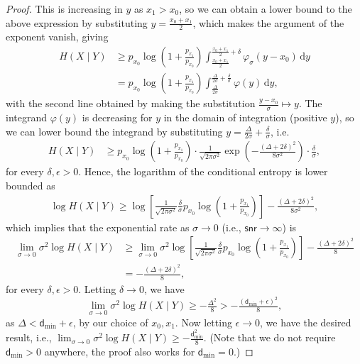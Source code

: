 \documentclass[10pt,a4paper]{amsart}
\newcommand{\dmin}{\mathsf{d}_{\min}}
\newcommand{\snr}{\mathsf{snr}}
\renewcommand{\d}{\,\mathrm{d}}
\begin{document}
\begin{proof}[Proof]
		This is increasing in $y$ as $x_1 > x_0$, so we can obtain a lower bound to the above expression by substituting $y = \frac{x_0 + x_1}{2}$, which makes the argument of the exponent vanish, giving 
		\begin{align*}
			H(X \mid Y) &\geq p_{x_0}\log \left(1+\tfrac{p_{x_1}}{p_{x_0}} \right) \int_{\frac{x_0 + x_1}{2}}^{\frac{x_0 + x_1}{2}+\delta}  \varphi_{\sigma}(y-x_0) \d y \\
			&= p_{x_0}\log \left(1+\tfrac{p_{x_1}}{p_{x_0}} \right) \int_{\frac{\Delta}{2\sigma}}^{\frac{\Delta}{2\sigma} + \frac{\delta}{\sigma}}  \varphi(y) \d y,
		\end{align*}
		with the second line obtained by making the substitution $\frac{y-x_0}{\sigma} \mapsto y$. 
		The integrand $\varphi(y)$ is decreasing for $y$ in the domain of integration (positive $y$), so we can lower bound the integrand by substituting $y = \frac{\Delta}{2\sigma} + \frac{\delta}{\sigma}$, i.e.
		\begin{align*}
			H(X \mid Y) &\geq p_{x_0}\log \left(1+\tfrac{p_{x_1}}{p_{x_0}} \right) \cdot \tfrac{1}{\sqrt{2\pi \sigma^2}} \exp\left(- \tfrac{(\Delta + 2\delta)^2}{8\sigma^2}\right) \cdot \tfrac{\delta}{\sigma},
		\end{align*}
		for every $\delta, \epsilon > 0$. Hence, the logarithm of the conditional entropy is lower bounded as
		\begin{align*}
			\log H(X \mid Y) \geq \log \left[\tfrac{1}{\sqrt{2\pi \sigma^2}}\tfrac{\delta}{\sigma} p_{x_0}\log \left(1+\tfrac{p_{x_1}}{p_{x_0}} \right) \right] - \tfrac{(\Delta + 2\delta)^2}{8\sigma^2},
		\end{align*}
		which implies that the exponential rate as $\sigma \to 0$ (i.e., $\snr \to \infty$) is 
		\begin{align*}
			\lim_{\sigma \to 0} \sigma^2 \log H(X \mid Y) &\geq \lim_{\sigma \to 0} \sigma^2\log \left[\tfrac{1}{\sqrt{2\pi \sigma^2}}\tfrac{\delta}{\sigma} p_{x_0}\log \left(1+\tfrac{p_{x_1}}{p_{x_0}} \right) \right] - \tfrac{(\Delta + 2\delta)^2}{8}\\
			&= -\tfrac{(\Delta + 2\delta)^2}{8},
		\end{align*}
		for every $\delta, \epsilon > 0$. Letting $\delta \to 0$, we have 
		$$\lim_{\sigma \to 0} \sigma^2 \log H(X \mid Y) \geq -\tfrac{\Delta^2}{8} > -\tfrac{(\dmin + \epsilon)^2}{8},$$
		as $\Delta < \dmin + \epsilon$, by our choice of $x_0, x_1$. Now letting $\epsilon \to 0$, we have the desired result, i.e., $\lim_{\sigma \to 0} \sigma^2 \log H(X \mid Y) \geq -\tfrac{\dmin^2}{8}$. (Note that we do not require $\dmin > 0$ anywhere, the proof also works for $\dmin = 0$.)
		

\end{proof}
\end{document}
